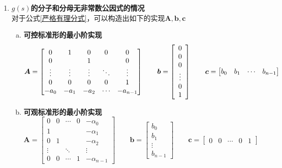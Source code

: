 \begin{enumerate}[\hspace*{2em} (1)]
	\item \textbf{$g(s)$的分子和分母无非常数公因式的情况}\\
	对于公式\eqref{严格有理分式}，可以构造出如下的实现$\bm{A},\bm{b},\bm{c}$
	\begin{enumerate}[(a) ]
		\item \textbf{可控标准形的最小阶实现}
		\begin{equation}
			\bm{A} = 
			\begin{bmatrix}
				0 & 1 & 0 & 0 & 0 \\
				0 &   & 1 &   & 0\\
				\vdots & \vdots & \vdots & \ddots & \vdots\\
				0 & 0 & 0 & 0 & 1\\
				-a_0 & -a_1 & -a_2 & \cdots & - a_{n-1} 
			\end{bmatrix}
			\qquad 
			\bm{b} =
			\begin{bmatrix}
				\hspace*{0.5em} 0 \hspace*{0.5em}\\
				0\\
				0\\
				\vdots\\
				0\\
				1
			\end{bmatrix}
			\qquad 
			\bm{c} = 
			\begin{bmatrix}
				b_0 & b_1 & \cdots & b_{n-1}
			\end{bmatrix}
			\label{可控标准形的最小阶实现}
		\end{equation}
	
		\item \textbf{可观标准形的最小阶实现}
		\begin{equation}
			\bm{A} = 
			\begin{bmatrix}
				0 & 0 & \cdots & 0 &  -\alpha_0\\
				1 &&&&-\alpha_1 \\
				0 & 1 & & & - \alpha_2\\
				\vdots &  & \ddots & & \vdots\\
				0 & 0 & \cdots & 1 & -\alpha_{n-1}
			\end{bmatrix}
			\qquad 
			\bm{b} = 
			\begin{bmatrix}
				b_0 \\
				b_1\\
				\vdots\\
				b_{n-1}
			\end{bmatrix}
			\qquad
			\bm{c} = 
			\begin{bmatrix}
				0 & 0 & \cdots & 0 & 1
			\end{bmatrix}
			\label{可观测标准形的最小阶实现}
		\end{equation}
	

\end{enumerate}
\end{enumerate}
